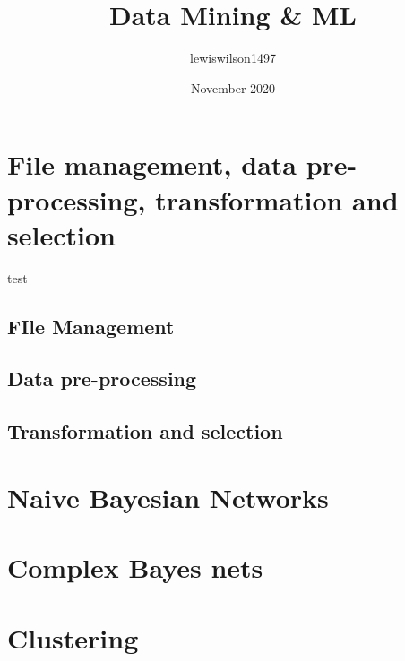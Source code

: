 \documentclass{article}
\title{Data Mining & ML}
\author{lewiswilson1497 }
\date{November 2020}
\begin{document}
\maketitle

\pagebreak

\tableofcontents
\thispagestyle{empty}
\pagebreak
\setcounter{page}{1}

\pagebreak


\section{File management, data pre-processing, transformation and selection}

test

\subsection{FIle Management}

\subsection{Data pre-processing}

\subsection{Transformation and selection}


\pagebreak

\section{Naive Bayesian Networks}

\pagebreak

\section{Complex Bayes nets}

\pagebreak

\section{Clustering}
\end{document}
